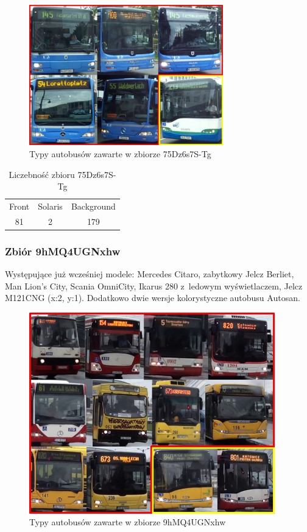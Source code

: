 \begin{figure}[!h]
    \centering
    \includegraphics[width=0.75\textwidth]{img/exp_trainig_data_75D}
    \caption{Typy autobusów zawarte w zbiorze 75Dz6s7S-Tg}
    \label{fig:75Dz6s7S-Tg_types}
\end{figure}

\begin{table}[!h]
    \centering
    \begin{tabular}{c|c|c}
        Front   & Solaris   & Background \\
        81      & 2         & 179 
    \end{tabular}
    \caption{Liczebność zbioru 75Dz6s7S-Tg}
    \label{tab:75Dz6s7S-Tg_count}
\end{table}

\newpage

\subsubsection{Zbiór 9hMQ4UGNxhw}

Występujące już wcześniej modele: Mercedes Citaro, zabytkowy Jelcz Berliet,
Man Lion's City, Scania OmniCity, Ikarus 280 z~ledowym wyświetlaczem,
Jelcz M121CNG (x:2, y:1). Dodatkowo dwie wersje kolorystyczne autobusu
Autosan.

\begin{figure}[!h]
    \centering
    \includegraphics[width=0.95\textwidth]{img/exp_trainig_data_9hM}
    \caption{Typy autobusów zawarte w zbiorze 9hMQ4UGNxhw}
    \label{fig:9hMQ4UGNxhw_types}
\end{figure}

